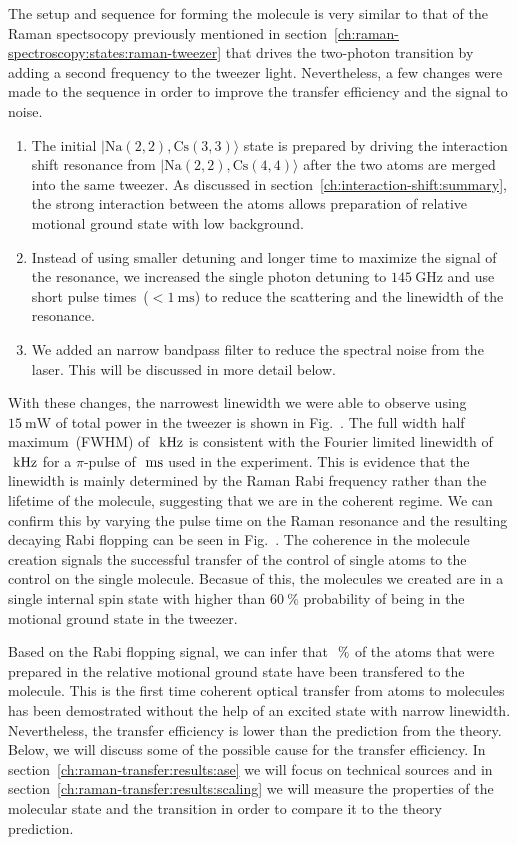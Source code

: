 The setup and sequence for forming the molecule is very similar to that of the Raman spectsocopy
previously mentioned in section~\ref{ch:raman-spectroscopy:states:raman-tweezer}
that drives the two-photon transition by adding a second frequency to the tweezer light.
Nevertheless, a few changes were made to the sequence in order to improve
the transfer efficiency and the signal to noise.
\begin{enumerate}
\item The initial $|\mathrm{Na(2,2),Cs(3,3)}\rangle$ state is prepared by driving the
  interaction shift resonance from $|\mathrm{Na(2,2),Cs(4,4)}\rangle$
  after the two atoms are merged into the same tweezer.
  As discussed in section~\ref{ch:interaction-shift:summary},
  the strong interaction between the atoms allows preparation of
  relative motional ground state with low background.
\item Instead of using smaller detuning and longer time to maximize the signal of the resonance,
  we increased the single photon detuning to $145~\mathrm{GHz}$
  and use short pulse times~($<1~\mathrm{ms}$)
  to reduce the scattering and the linewidth of the resonance.
\item We added an narrow bandpass filter to reduce the spectral noise from the laser.
  This will be discussed in more detail below.
\end{enumerate}

With these changes, the narrowest linewidth we were able to observe using $15~\mathrm{mW}$
of total power in the tweezer is shown in Fig.~.
The full width half maximum~(FWHM) of $\todo{number}~\mathrm{kHz}$ is consistent
with the Fourier limited linewidth of $\todo{number}~\mathrm{kHz}$
for a $\pi$-pulse of $\todo{number}~\mathrm{ms}$ used in the experiment.
This is evidence that the linewidth is mainly determined by the Raman Rabi frequency
rather than the lifetime of the molecule, suggesting that we are in the coherent regime.
We can confirm this by varying the pulse time on the Raman resonance
and the resulting decaying Rabi flopping can be seen in Fig.~.
The coherence in the molecule creation signals the successful transfer
of the control of single atoms to the control on the single molecule.
Becasue of this, the molecules we created are in a single internal spin state
with higher than $60~\mathrm{\%}$ probability
of being in the motional ground state in the tweezer.

Based on the Rabi flopping signal, we can infer that $\todo{number}~\mathrm{\%}$ of the atoms
that were prepared in the relative motional ground state have been transfered to the molecule.
This is the first time coherent optical transfer from atoms to molecules has been demostrated
without the help of an excited state with narrow linewidth.
Nevertheless, the transfer efficiency is lower than the prediction from the theory.
Below, we will discuss some of the possible cause for the transfer efficiency.
In section~\ref{ch:raman-transfer:results:ase} we will focus on technical sources
and in section~\ref{ch:raman-transfer:results:scaling}
we will measure the properties of the molecular state and the transition
in order to compare it to the theory prediction.

